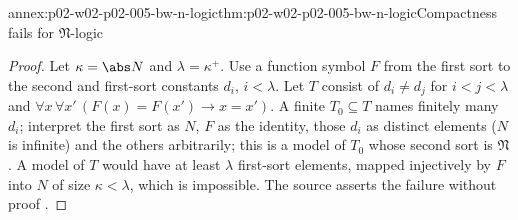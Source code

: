 \begin{annexitem}{annex:p02-w02-p02-005-bw-n-logic}{thm:p02-w02-p02-005-bw-n-logic}{Compactness fails for \(\mathfrak N\)-logic}
\begin{proof}
Let \(\kappa=\abs N\) and \(\lambda=\kappa^+\).  Use a function symbol
\(F\) from the first sort to the second and first-sort constants \(d_i\),
\(i<\lambda\).  Let \(T\) consist of \(d_i\neq d_j\) for \(i<j<\lambda\)
and \(\forall x\,\forall x'\,(F(x)=F(x')\to x=x')\).  A finite
\(T_0\subseteq T\) names finitely many \(d_i\); interpret the first sort as
\(N\), \(F\) as the identity, those \(d_i\) as distinct elements (\(N\) is
infinite) and the others arbitrarily; this is a model of \(T_0\) whose
second sort is \(\mathfrak N\).  A model of \(T\) would have at least
\(\lambda\) first-sort elements, mapped injectively by \(F\) into \(N\) of
size \(\kappa<\lambda\), which is impossible.  The source asserts the
failure without proof \cite[ch.~A.1, \S5, pp.~42--43]{Barwise1977FirstOrder}.
\end{proof}
\end{annexitem}

